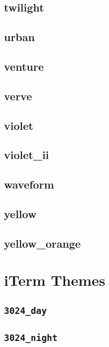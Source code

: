 \subsection{\ttfamily twilight\label{section:default}}
\newpage
\subsection{\ttfamily urban}
\newpage
\subsection{\ttfamily venture}
\newpage
\subsection{\ttfamily verve}
\newpage
\subsection{\ttfamily violet}
\newpage
\subsection{\ttfamily violet\_ii}
\newpage
\subsection{\ttfamily waveform}
\newpage
\subsection{\ttfamily yellow}
\newpage
\subsection{\ttfamily yellow\_orange}
\newpage
\section{iTerm Themes}
\subsection{\texttt{3024\_day}}
\newpage
\subsection{\texttt{3024\_night}}
\newpage
